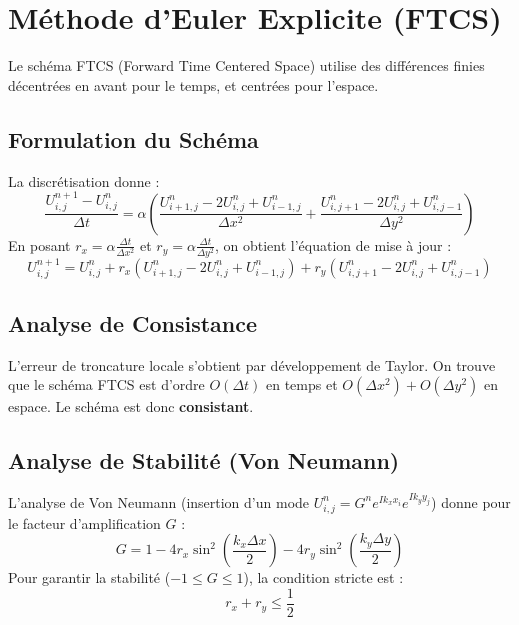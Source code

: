 \documentclass[11pt,a4paper]{article}
\begin{document}
\section{Méthode d'Euler Explicite (FTCS)}

Le schéma FTCS (Forward Time Centered Space) utilise des différences finies décentrées en avant pour le temps, et centrées pour l'espace.

\subsection{Formulation du Schéma}
La discrétisation donne :
\begin{equation}
\frac{U_{i,j}^{n+1} - U_{i,j}^n}{\Delta t} = \alpha \left( \frac{U_{i+1,j}^n - 2U_{i,j}^n + U_{i-1,j}^n}{\Delta x^2} + \frac{U_{i,j+1}^n - 2U_{i,j}^n + U_{i,j-1}^n}{\Delta y^2} \right)
\end{equation}
En posant $r_x = \alpha \frac{\Delta t}{\Delta x^2}$ et $r_y = \alpha \frac{\Delta t}{\Delta y^2}$, on obtient l'équation de mise à jour :
\begin{equation}
U_{i,j}^{n+1} = U_{i,j}^n + r_x (U_{i+1,j}^n - 2U_{i,j}^n + U_{i-1,j}^n) + r_y (U_{i,j+1}^n - 2U_{i,j}^n + U_{i,j-1}^n)
\end{equation}

\subsection{Analyse de Consistance}
L'erreur de troncature locale s'obtient par développement de Taylor. On trouve que le schéma FTCS est d'ordre $O(\Delta t)$ en temps et $O(\Delta x^2) + O(\Delta y^2)$ en espace. Le schéma est donc \textbf{consistant}.

\subsection{Analyse de Stabilité (Von Neumann)}
L'analyse de Von Neumann (insertion d'un mode $U_{i,j}^n = G^n e^{I k_x x_i} e^{I k_y y_j}$) donne pour le facteur d'amplification $G$ :
\begin{equation}
G = 1 - 4 r_x \sin^2\left(\frac{k_x \Delta x}{2}\right) - 4 r_y \sin^2\left(\frac{k_y \Delta y}{2}\right)
\end{equation}
Pour garantir la stabilité ($-1 \leq G \leq 1$), la condition stricte est :
\begin{equation}
r_x + r_y \leq \frac{1}{2}
\end{equation}
\end{document}
